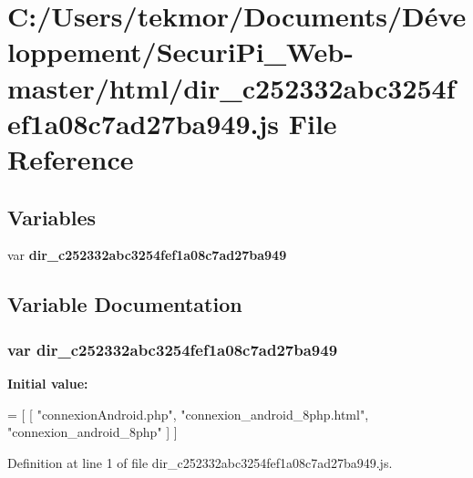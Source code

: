 \section{C\+:/\+Users/tekmor/\+Documents/\+Développement/\+Securi\+Pi\+\_\+\+Web-\/master/html/dir\+\_\+c252332abc3254fef1a08c7ad27ba949.js File Reference}
\label{dir__c252332abc3254fef1a08c7ad27ba949_8js}
\subsection*{Variables}
\begin{DoxyCompactItemize}
\item 
var {\bf dir\+\_\+c252332abc3254fef1a08c7ad27ba949}
\end{DoxyCompactItemize}


\subsection{Variable Documentation}
\subsubsection[{dir\+\_\+c252332abc3254fef1a08c7ad27ba949}]{\setlength{\rightskip}{0pt plus 5cm}var dir\+\_\+c252332abc3254fef1a08c7ad27ba949}\label{dir__c252332abc3254fef1a08c7ad27ba949_8js_a32d74ff3cef51b81ccf1019302721132}
{\bfseries Initial value\+:}
\begin{DoxyCode}
=
[
    [ \textcolor{stringliteral}{"connexionAndroid.php"}, \textcolor{stringliteral}{"connexion\_android\_8php.html"}, \textcolor{stringliteral}{"connexion\_android\_8php"} ]
]
\end{DoxyCode}


Definition at line 1 of file dir\+\_\+c252332abc3254fef1a08c7ad27ba949.\+js.

